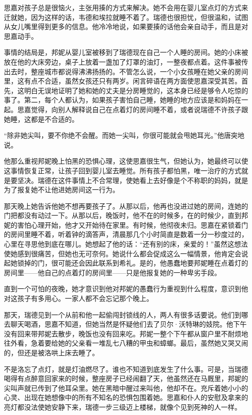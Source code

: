 \par 思嘉对孩子总是很恼火，主张用揍的方式来解决。她不会用在婴儿室点灯的方式来迁就她，因为这样的话，韦德和埃拉就睡不着了。瑞德也很担忧，但很温和，试图从女儿嘴里得到更多的信息。他冷冷地说，如果要揍的话他会亲自动手，而且是对思嘉动手。
\par 事情的结局是，邦妮从婴儿室被移到了瑞德现在自己一个人睡的房间。她的小床被放在他的大床旁边，桌子上放着一盏加了灯罩的油灯，一整夜都点着。这件事被传出去时，整座城市都说得沸沸扬扬的。不管怎么说，一个小女孩睡在她父亲的房间里，这有点不合适，虽然女孩还只有两岁。闲言碎语在两方面使思嘉深受其苦。首先，这明白无误地证明了她和她的丈夫是分房睡觉的，这本身已经是够令人吃惊的事了。第二，每个人都认为，如果孩子害怕自己睡，她睡的地方应该是和妈妈在一起。思嘉觉得，向别人解释说自己在点着灯的房间睡不着，或者说瑞德不许孩子跟她睡，这都是不合适的。
\par “除非她尖叫，要不你绝不会醒。而她一尖叫，你很可能就会甩她耳光。”他唐突地说。
\par 他那么重视邦妮晚上怕黑的恐惧心理，这使思嘉很生气，但她认为，她最终可以使这事情恢复正常，让孩子回到婴儿室去睡觉。所有孩子都怕黑，唯一治疗的方式就是要坚决。瑞德在这件事情上不合常理，使她看上去好像是个不称职的妈妈，就是为了报复她不让他进她房间这一行为。
\par 那天晚上她告诉他她不想再要孩子了。从那以后，他再也没进过她的房间，连她的门把都没有动过一下。从那以后，晚饭时，他不在的时候多，在的时候少，直到邦妮的害怕心理开始，他才又开始待在家里。有时候，他彻夜未归。思嘉在紧锁着门的房间里睡不着，听着钟的滴答声，清晨那几个小时简直是数着一分一秒度过的，心里在寻思他到底在哪儿。她想起了他的话：“还有别的床，亲爱的！”虽然这想法使她感到很痛苦，但她也无可奈何。她说什么都会促成这么一幅情景，他肯定会说起她锁掉的门，很可能还会因此联系到希礼。是的，他愚蠢地要邦妮睡在点着灯的房间里——他自己的点着灯的房间里——只是他报复她的一种卑劣手段。
\par 直到一个可怕的夜晚，她才意识到他对邦妮的愚蠢行为重视到什么程度，意识到他对这孩子有多用心。一家人都不会忘记那个晚上。
\par 那天，瑞德见到一个从前和他一起偷闯封锁线的人，两人有很多话要说。他们到哪去聊天喝酒，思嘉不知道，但她当然是怀疑他们去了贝尔·沃特琳的妓院。他下午没有回来带邦妮去散步，晚饭也没有回来吃。邦妮一整个下午都从窗户里不耐烦地往外看，急着要给她的父亲看一堆乱七八糟的甲虫和蟑螂。最后，虽然她又哭又闹的，但还是被洛哄上床去睡了。
\par 不是洛忘了点灯，就是灯油燃尽了。谁也不知道到底发生了什么事。可是，当瑞德喝得有点醉意回家来的时候，整座房子已经闹翻了天，他虽然还在马厩里，邦妮的尖叫声就已传到了他耳朵里。她在黑暗中醒过来叫他，他却不在。充斥着她小小的心灵、出现在她想像中的所有不知名的恐惧包围着她。思嘉和仆人的安慰及拿来的亮灯都没法使她安静下来，瑞德一步三级迈上楼梯，就像个见到死神的人一样。
